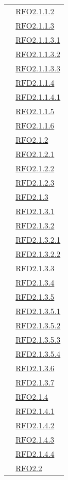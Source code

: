 \begin{longtable}{|>{\centering}m{5cm}|m{5cm}<{\centering}|}
& \hyperlink{RFO2.1.1.2}{RFO2.1.1.2}\\
& \hyperlink{RFO2.1.1.3}{RFO2.1.1.3}\\
& \hyperlink{RFO2.1.1.3.1}{RFO2.1.1.3.1}\\
& \hyperlink{RFO2.1.1.3.2}{RFO2.1.1.3.2}\\
& \hyperlink{RFO2.1.1.3.3}{RFO2.1.1.3.3}\\
& \hyperlink{RFD2.1.1.4}{RFD2.1.1.4}\\
& \hyperlink{RFD2.1.1.4.1}{RFD2.1.1.4.1}\\
& \hyperlink{RFO2.1.1.5}{RFO2.1.1.5}\\
& \hyperlink{RFO2.1.1.6}{RFO2.1.1.6}\\
& \hyperlink{RFO2.1.2}{RFO2.1.2}\\
& \hyperlink{RFO2.1.2.1}{RFO2.1.2.1}\\
& \hyperlink{RFO2.1.2.2}{RFO2.1.2.2}\\
& \hyperlink{RFD2.1.2.3}{RFD2.1.2.3}\\
& \hyperlink{RFD2.1.3}{RFD2.1.3}\\
& \hyperlink{RFD2.1.3.1}{RFD2.1.3.1}\\
& \hyperlink{RFD2.1.3.2}{RFD2.1.3.2}\\
& \hyperlink{RFD2.1.3.2.1}{RFD2.1.3.2.1}\\
& \hyperlink{RFD2.1.3.2.2}{RFD2.1.3.2.2}\\
& \hyperlink{RFD2.1.3.3}{RFD2.1.3.3}\\
& \hyperlink{RFD2.1.3.4}{RFD2.1.3.4}\\
& \hyperlink{RFD2.1.3.5}{RFD2.1.3.5}\\
& \hyperlink{RFD2.1.3.5.1}{RFD2.1.3.5.1}\\
& \hyperlink{RFD2.1.3.5.2}{RFD2.1.3.5.2}\\
& \hyperlink{RFD2.1.3.5.3}{RFD2.1.3.5.3}\\
& \hyperlink{RFD2.1.3.5.4}{RFD2.1.3.5.4}\\
& \hyperlink{RFD2.1.3.6}{RFD2.1.3.6}\\
& \hyperlink{RFD2.1.3.7}{RFD2.1.3.7}\\
& \hyperlink{RFO2.1.4}{RFO2.1.4}\\
& \hyperlink{RFD2.1.4.1}{RFD2.1.4.1}\\
& \hyperlink{RFD2.1.4.2}{RFD2.1.4.2}\\
& \hyperlink{RFO2.1.4.3}{RFO2.1.4.3}\\
& \hyperlink{RFD2.1.4.4}{RFD2.1.4.4}\\
& \hyperlink{RFO2.2}{RFO2.2}\\

\end{longtable}
